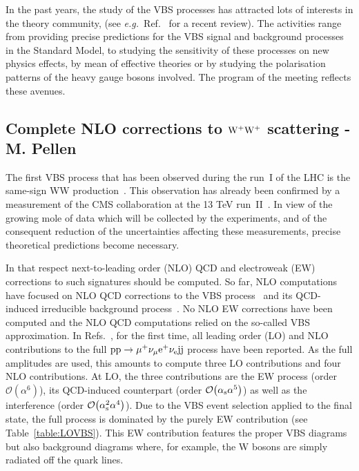 In the past years, the study of the VBS processes has attracted lots of interests in the theory community, (see \emph{e.g.}\ Ref.~\cite{Rauch:2016pai} for 
a recent review).
The activities range from providing precise predictions for the VBS signal and background processes in the Standard Model, to studying the sensitivity of these 
processes on new physics effects, by mean of effective theories or by studying the polarisation patterns of the heavy gauge bosons involved.
The program of the meeting reflects these avenues.

\subsection{Complete NLO corrections to ${\rm W^+ W^+}$ scattering - M. Pellen}

The first VBS process that has been observed during the run~I of the LHC is the same-sign WW production~\cite{Aad:2014zda,Aaboud:2016ffv,Khachatryan:2014sta}.
This observation has already been confirmed by a measurement of the CMS collaboration at the 13 TeV run~II~\cite{CMS:2017adb}.
In view of the growing mole of data which will be collected by the experiments, and of the consequent reduction of the uncertainties affecting these measurements, precise theoretical predictions become necessary.

In that respect next-to-leading order (NLO) QCD and electroweak (EW) corrections to such signatures should be computed.
So far, NLO computations have focused on NLO QCD corrections to the VBS process~\cite{Jager:2009xx,Jager:2011ms,Denner:2012dz,Rauch:2016pai} and its QCD-induced irreducible background process~\cite{Melia:2010bm,Melia:2011gk,Campanario:2013gea,Baglio:2014uba,Rauch:2016pai}.
No NLO EW corrections have been computed and the NLO QCD computations relied on the so-called VBS approximation.
In Refs.~\cite{Biedermann:2016yds,Biedermann:2017bss}, for the first time, all leading order (LO) and NLO contributions to the full ${\rm p}{\rm p}\to\mu^+\nu_\mu{\rm e}^+\nu_{\rm e}{\rm j}{\rm j}$ process have been reported.
As the full amplitudes are used, this amounts to compute three LO contributions and four NLO contributions.
At LO, the three contributions are the EW process (order $\mathcal{O}{\left(\alpha^{6}\right)}$), its QCD-induced counterpart (order $\mathcal{O}{\left(\alpha_{\rm s}\alpha^{5}\right)}$) as well as the interference (order $\mathcal{O}{\left(\alpha_{\rm s}^2\alpha^{4}\right)}$).
Due to the VBS event selection applied to the final state, the full process is dominated by the purely EW contribution (see Table~\ref{table:LOVBS}).
This EW contribution features the proper VBS diagrams but also background diagrams where, for example, the W bosons are simply radiated off the quark lines.

